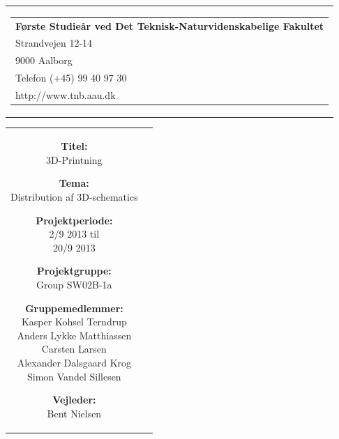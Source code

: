 
% 
\thispagestyle{empty}
{\samepage 
\begin{tabular}{r}
	\parbox{\textwidth}{  
	\hfill \parbox{8cm}{\begin{tabular}{l} %
		{\small \textbf{Første Studieår ved Det Teknisk-Naturvidenskabelige Fakultet}}\\
		{\small Strandvejen 12-14} \\
		{\small 9000 Aalborg} \\
		{\small Telefon (+45) 99 40 97 30} \\
		{\small http://www.tnb.aau.dk}
	\end{tabular}}
	}
\end{tabular}

\begin{tabular}{cc}
	\parbox{8cm}{
	\begin{description}
		\item { \textbf{Titel:}}\\ 
			3D-Printning
    		\item { \textbf{Tema:}}\\ 
			Distribution af 3D-schematics
	\end{description}
	
	\parbox{8cm}{
	\begin{description}
		\item { \textbf{Projektperiode:}}\\
			2/9 2013 til\\
			20/9 2013\\
 		\hspace{4cm}
		\item { \textbf{Projektgruppe:}}\\
  			Group SW02B-1a
 		\hspace{4cm}
		\item {\textbf{Gruppemedlemmer:}}\\
			Kasper Kohsel Terndrup\\
			Anders Lykke Matthiassen\\
			Carsten Larsen\\
			Alexander Dalsgaard Krog\\
			Simon Vandel Sillesen\\
		\hspace{2cm}
		\item { \textbf{Vejleder:}}\\
 			Bent Nielsen\\
  	\end{description}
	}

}
\end{tabular}}

